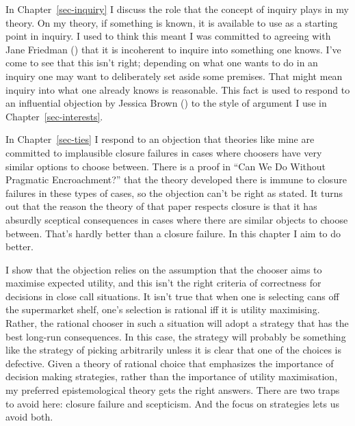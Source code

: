 \documentclass[
  10pt,
  letterpaper,
  twoside]{scrbook}
\begin{document}
In Chapter~\ref{sec-inquiry} I discuss the role that the concept of
inquiry plays in my theory. On my theory, if something is known, it is
available to use as a starting point in inquiry. I used to think this
meant I was committed to agreeing with Jane Friedman
() that it is incoherent to inquire
into something one knows. I've come to see that this isn't right;
depending on what one wants to do in an inquiry one may want to
deliberately set aside some premises. That might mean inquiry into what
one already knows is reasonable. This fact is used to respond to an
influential objection by Jessica Brown ()
to the style of argument I use in Chapter~\ref{sec-interests}.

In Chapter~\ref{sec-ties} I respond to an objection that theories like
mine are committed to implausible closure failures in cases where
choosers have very similar options to choose between. There is a proof
in ``Can We Do Without Pragmatic Encroachment?'' that the theory
developed there is immune to closure failures in these types of cases,
so the objection can't be right as stated. It turns out that the reason
the theory of that paper respects closure is that it has absurdly
sceptical consequences in cases where there are similar objects to
choose between. That's hardly better than a closure failure. In this
chapter I aim to do better.

I show that the objection relies on the assumption that the chooser aims
to maximise expected utility, and this isn't the right criteria of
correctness for decisions in close call situations. It isn't true that
when one is selecting cans off the supermarket shelf, one's selection is
rational iff it is utility maximising. Rather, the rational chooser in
such a situation will adopt a strategy that has the best long-run
consequences. In this case, the strategy will probably be something like
the strategy of picking arbitrarily unless it is clear that one of the
choices is defective. Given a theory of rational choice that emphasizes
the importance of decision making strategies, rather than the importance
of utility maximisation, my preferred epistemological theory gets the
right answers. There are two traps to avoid here: closure failure and
scepticism. And the focus on strategies lets us avoid both.
\end{document}
